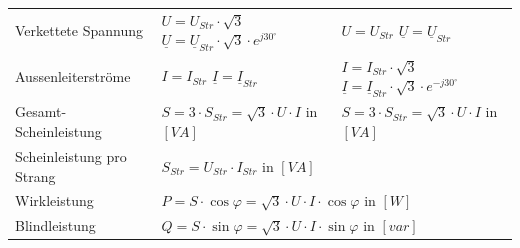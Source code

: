 \begin{tabular}{| p{4.5cm} | l | l |}
			 			Verkettete Spannung &
			 				$U = U_{Str} \cdot \sqrt{3}$ \hspace{0.2cm} $\underline{U} = \underline{U}_{Str} \cdot \sqrt{3} \cdot e^{j 30^\circ}$ &
			 				$U = U_{Str}$ \hspace{0.2cm} $\underline{U} = \underline{U}_{Str}$ \\
			 			Aussenleiterströme &
			 				$I = I_{Str}$ \hspace{0.2cm} $\underline{I} = \underline{I}_{Str}$ &
			 				$I = I_{Str} \cdot \sqrt{3} $ \hspace{0.2cm} $\underline{I} =
			 				\underline{I}_{Str} \cdot \sqrt{3} \cdot e^{-j 30^\circ} $ \\ Gesamt-Scheinleistung &
			 				$S = 3 \cdot S_{Str} =\sqrt{3} \cdot U \cdot I $ \hspace{0.2cm} in $[VA]$
			 				& $S = 3 \cdot S_{Str} = \sqrt{3} \cdot U \cdot I$ \hspace{0.2cm} in $[VA]$ \\ Scheinleistung pro Strang &
			 				\multicolumn{2}{l|}{\hspace{3cm} $S_{Str} = U_{Str} \cdot I_{Str}$ \hspace{0.2cm} in $[VA]$} \\
			 			Wirkleistung &
			 				\multicolumn{2}{l|}{\hspace{3cm} $P = S \cdot \cos\varphi = \sqrt{3} \cdot U \cdot I \cdot \cos\varphi$ \hspace{0.2cm} in $[W]$} \\
			 			Blindleistung &
			 				\multicolumn{2}{l|}{\hspace{3cm} $Q = S \cdot \sin\varphi = \sqrt{3} \cdot U \cdot I \cdot \sin\varphi$ \hspace{0.2cm} in $[var]$} \\
		 			\hline
				\end{tabular}
	        \renewcommand{\arraystretch}{1}
	
